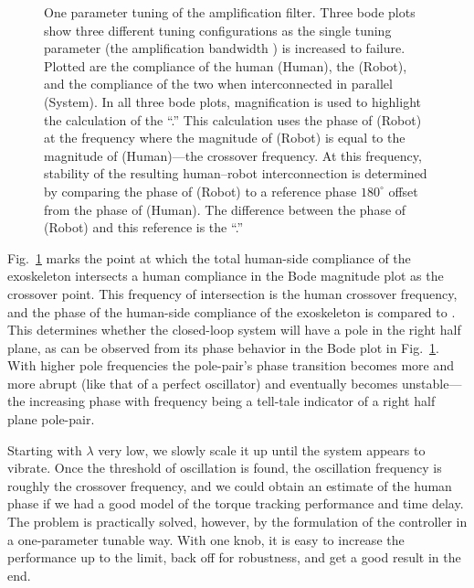 \begin{figure}
	\centering
	\resizebox{1\textwidth}{!}{
	\def\svgwidth{\textwidth}
	{%
		}}
	\caption{One parameter tuning of the amplification filter. Three bode plots show three different tuning configurations as the single tuning parameter (the amplification bandwidth \ta{$\lambda$}) is increased to failure.  Plotted are the compliance of the human (Human), the   (Robot), and the compliance of the two when interconnected in parallel (System). In all three bode plots, magnification is used to highlight the calculation of the ``.'' This calculation uses the phase of (Robot) at the frequency where the magnitude of (Robot) is equal to the magnitude of (Human)---the crossover frequency. At this frequency, stability of the resulting human--robot interconnection is determined by comparing the phase of (Robot) to a reference phase $180^\circ$ offset from the phase of (Human). The difference between the phase of (Robot) and this reference is the ``.'' }\label{fig:oneptune}
\end{figure}

Fig.~\ref{fig:oneptune} marks the point at which the total human-side compliance of the exoskeleton intersects a human compliance in the Bode magnitude plot as the crossover point. This frequency of intersection is the human crossover frequency, and the phase of the human-side compliance of the exoskeleton is compared to . This  determines whether the closed-loop system will have a pole in the right half plane, as can be observed from its phase behavior in the Bode plot in Fig.~\ref{fig:oneptune}. With higher pole frequencies the pole-pair's phase transition becomes more and more abrupt (like that of a perfect oscillator) and eventually becomes unstable---the increasing phase with frequency being a tell-tale indicator of a right half plane pole-pair.

Starting with $\lambda$ very low, we slowly scale it up until the system appears to vibrate. Once the threshold of oscillation is found, the oscillation frequency is roughly the crossover frequency, and we could obtain an estimate of the human phase if we had a good model of the torque tracking performance and time delay. The problem is practically solved, however, by the formulation of the controller in a one-parameter tunable way. With one knob, it is easy to increase the performance up to the limit, back off for robustness, and get a good result in the end.


